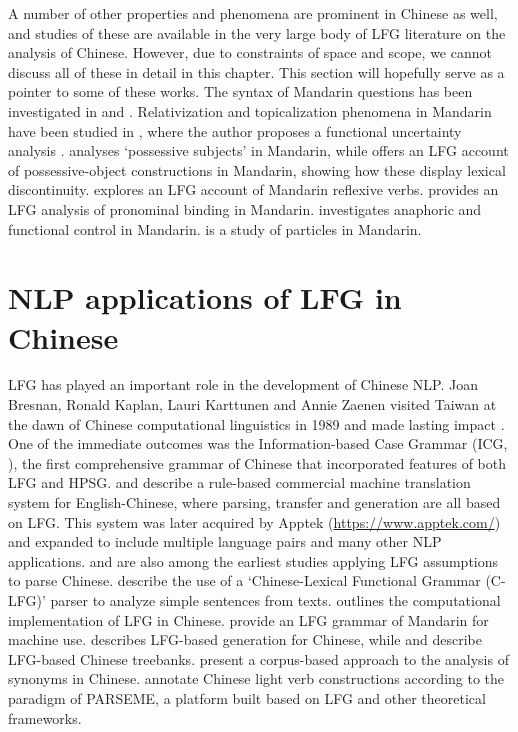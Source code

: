 \documentclass[output=paper,chinesefont,hidelinks]{langscibook}
\begin{document}
A number of other properties and phenomena are prominent in Chinese as well, and studies of these are available in the very large body of LFG literature on the analysis of Chinese. However, due to constraints of space and scope, we cannot discuss all of these in detail in this chapter. This section will hopefully serve as a pointer to some of these works. The syntax of Mandarin questions has been investigated in \citet{ShiuHuang1989} and \citet{Huang1993b}. Relativization and topicalization phenomena in Mandarin have been studied in \citet{Huang1992}, where the author proposes a functional uncertainty analysis \citep{kaplzaen89}. \citet{Huang1988} analyses `possessive subjects' in Mandarin, while \citet{Huang1990} offers an LFG account of possessive-object constructions in Mandarin, showing how these display lexical discontinuity. \citet{Chief1996} explores an LFG account of Mandarin reflexive verbs. \citet{Dong2016} provides an LFG analysis of pronominal binding in Mandarin. \citet{Lam2020} investigates anaphoric and functional control in Mandarin. \citet{Che2014} is a study of particles in Mandarin.

\section{NLP applications of LFG in Chinese}
\label{sec:Sinitic:4.8}

LFG has played an important role in the development of Chinese NLP. Joan Bresnan, Ronald Kaplan, Lauri Karttunen and Annie Zaenen visited Taiwan at the dawn of Chinese computational linguistics in 1989 and made lasting impact \citep{Bresnan89}. One of the immediate outcomes was the Information-based Case Grammar (ICG, \citealt{Chen1990}), the first comprehensive grammar of Chinese that incorporated features of both LFG and HPSG. \citet{HerHiginbothamPentheroudakis1991} and \citet{Her1995} describe a rule-based commercial machine translation system for English-Chinese, where parsing, transfer and generation are all based on LFG. This system was later acquired by Apptek (\url{https://www.apptek.com/}) and expanded to include multiple language pairs and many other NLP applications. \citet{Kit1992,Kit1993a,Kit1993b} and \citet{KitWebster1992} are also among the earliest studies applying LFG assumptions to parse Chinese. \citet{WebsterKit1995} describe the use of a `Chinese-Lexical Functional Grammar (C-LFG)' parser to analyze simple sentences from texts. \citet{Sun2001} outlines the computational implementation of LFG in Chinese. \citet{Fang-King-GEAF07} provide an LFG grammar of Mandarin for machine use. \citet{GuoWangGenabith2008} describes LFG-based generation for Chinese, while \citet{burke-etal-2004-treebank} and \citet{Guo:09} describe LFG-based Chinese treebanks. \citet{ChiefHuangChenTsaiChang2000} present a corpus-based approach to the analysis of synonyms in Chinese. \citet{JiangEtAl2019} annotate Chinese light verb constructions according to the paradigm of PARSEME, a platform built based on LFG and other theoretical frameworks.
\end{document}

